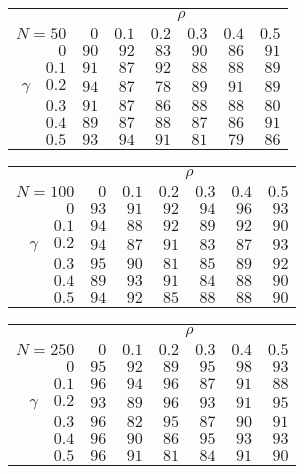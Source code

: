 \begin{tabular}{r|rrrrrr}
\hline\hline
 &\multicolumn{6}{c}{$\rho$} \\ 
 $N = 50$ & $0$ & $0.1$ & $0.2$ & $0.3$ & $0.4$ & $0.5$ \\ 
 \hline$0$ & $90$ & $92$ & $83$ & $90$ & $86$ & $91$\\ 
$0.1$ & $91$ & $87$ & $92$ & $88$ & $88$ & $89$\\ 
$\gamma\quad$$0.2$ & $94$ & $87$ & $78$ & $89$ & $91$ & $89$\\ 
$0.3$ & $91$ & $87$ & $86$ & $88$ & $88$ & $80$\\ 
$0.4$ & $89$ & $87$ & $88$ & $87$ & $86$ & $91$\\ 
$0.5$ & $93$ & $94$ & $91$ & $81$ & $79$ & $86$\\ 
 \hline 
 \end{tabular}
 
 \vspace{2em} 
 
\begin{tabular}{r|rrrrrr}
\hline\hline
 &\multicolumn{6}{c}{$\rho$} \\ 
 $N = 100$ & $0$ & $0.1$ & $0.2$ & $0.3$ & $0.4$ & $0.5$ \\ 
 \hline$0$ & $93$ & $91$ & $92$ & $94$ & $96$ & $93$\\ 
$0.1$ & $94$ & $88$ & $92$ & $89$ & $92$ & $90$\\ 
$\gamma\quad$$0.2$ & $94$ & $87$ & $91$ & $83$ & $87$ & $93$\\ 
$0.3$ & $95$ & $90$ & $81$ & $85$ & $89$ & $92$\\ 
$0.4$ & $89$ & $93$ & $91$ & $84$ & $88$ & $90$\\ 
$0.5$ & $94$ & $92$ & $85$ & $88$ & $88$ & $90$\\ 
 \hline 
 \end{tabular}
 
 \vspace{2em} 
 
\begin{tabular}{r|rrrrrr}
\hline\hline
 &\multicolumn{6}{c}{$\rho$} \\ 
 $N = 250$ & $0$ & $0.1$ & $0.2$ & $0.3$ & $0.4$ & $0.5$ \\ 
 \hline$0$ & $95$ & $92$ & $89$ & $95$ & $98$ & $93$\\ 
$0.1$ & $96$ & $94$ & $96$ & $87$ & $91$ & $88$\\ 
$\gamma\quad$$0.2$ & $93$ & $89$ & $96$ & $93$ & $91$ & $95$\\ 
$0.3$ & $96$ & $82$ & $95$ & $87$ & $90$ & $91$\\ 
$0.4$ & $96$ & $90$ & $86$ & $95$ & $93$ & $93$\\ 
$0.5$ & $96$ & $91$ & $81$ & $84$ & $91$ & $90$\\ 
 \hline 
 \end{tabular}